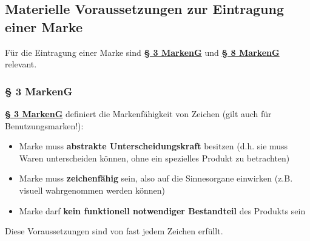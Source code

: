 \documentclass[12pt,A4]{extarticle}
\newcommand{\highlight}[1]{\textcolor{highlightColor}{\textbf{#1}}}
\newcommand{\markenG}[2][]{\textbf{\textcolor{markenGesetzLink}{\href{https://www.gesetze-im-internet.de/markeng/__#2.html}{§ #2 \ifthenelse{\equal{#1}{}}{}{#1 }MarkenG}}}}
\begin{document}
\subsection{Materielle Voraussetzungen zur Eintragung einer Marke}
Für die Eintragung einer Marke sind \markenG{3} und \markenG{8} relevant.

\subsubsection{§ 3 MarkenG}
\markenG{3} definiert die Markenfähigkeit von Zeichen (gilt auch für Benutzungsmarken!):
\begin{itemize}
  \item{Marke muss \highlight{abstrakte Unterscheidungskraft} besitzen (d.h. sie muss Waren unterscheiden können, ohne ein spezielles Produkt zu betrachten)}
  \item{Marke muss \textbf{zeichenfähig} sein, also auf die Sinnesorgane einwirken (z.B. visuell wahrgenommen werden können)}
  \item{Marke darf \textbf{kein funktionell notwendiger Bestandteil} des Produkts sein}
\end{itemize}
Diese Voraussetzungen sind von fast jedem Zeichen erfüllt.
\end{document}
